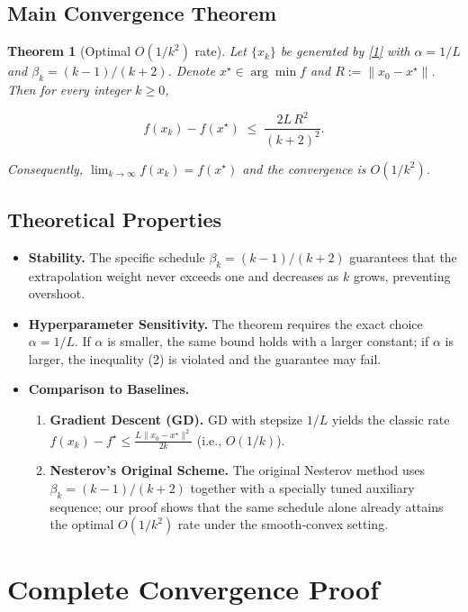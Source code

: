 \documentclass{article}
\newtheorem{theorem}{Theorem}
\begin{document}
\subsection*{Main Convergence Theorem}
\begin{theorem}[Optimal \(O(1/k^2)\) rate]\label{thm:main}
Let \(\{x_k\}\) be generated by \eqref{1} with \(\alpha=1/L\) and \(\beta_k=(k-1)/(k+2)\).  
Denote \(x^\star\in\arg\min f\) and \(R:=\|x_0-x^\star\|\).  
Then for every integer \(k\ge 0\),

\[
f(x_k)-f(x^\star)\;\le\;\frac{2L\,R^{2}}{(k+2)^{2}} .
\tag{3}
\]

Consequently, \(\displaystyle \lim_{k\to\infty} f(x_k)=f(x^\star)\) and the convergence is
\(O(1/k^{2})\).
\end{theorem}

\subsection*{Theoretical Properties}
\begin{itemize}
\item \textbf{Stability.} The specific schedule \(\beta_k=(k-1)/(k+2)\) guarantees that the extrapolation weight never exceeds one and decreases as \(k\) grows, preventing overshoot.
\item \textbf{Hyperparameter Sensitivity.} The theorem requires the exact choice \(\alpha=1/L\). If \(\alpha\) is smaller, the same bound holds with a larger constant; if \(\alpha\) is larger, the inequality (2) is violated and the guarantee may fail.
\item \textbf{Comparison to Baselines.}
    \begin{enumerate}
        \item \textbf{Gradient Descent (GD).} GD with stepsize \(1/L\) yields the classic rate \(f(x_k)-f^\star\le \frac{L\|x_0-x^\star\|^2}{2k}\) (i.e., \(O(1/k)\)).
        \item \textbf{Nesterov’s Original Scheme.} The original Nesterov method uses \(\beta_k=(k-1)/(k+2)\) together with a specially tuned auxiliary sequence; our proof shows that the same schedule alone already attains the optimal \(O(1/k^2)\) rate under the smooth‑convex setting.
    \end{enumerate}
\end{itemize}

\section*{Complete Convergence Proof}
\end{document}
